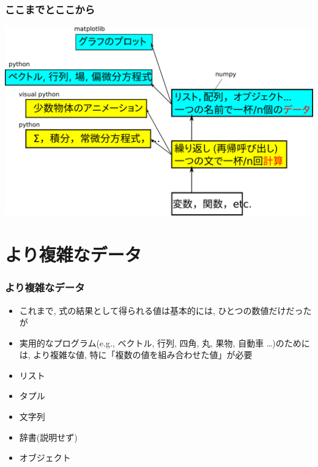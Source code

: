 \documentclass[10pt,dvipdfmx]{beamer}
\begin{document}
\begin{frame}
\frametitle{ここまでとここから}

\begin{center}
\includegraphics[height=0.9\textheight]{out/pdf/svg/roadmap.pdf}
\end{center}


\end{frame}


\section{より複雑なデータ}

\begin{frame}[fragile]
\frametitle{より複雑なデータ}
\begin{itemize}
\item これまで, 式の結果として得られる値は基本的には,
ひとつの数値だけだったが
\item 実用的なプログラム(e.g., ベクトル, 行列, 四角, 丸, 果物,
自動車 \ldots)のためには, より複雑な値, 
特に「複数の値を組み合わせた値」が必要
\end{itemize}

\begin{itemize}
\item リスト
\item タプル
\item 文字列
\item 辞書(説明せず)
\item オブジェクト
\end{itemize}

\end{frame}
\end{document}
